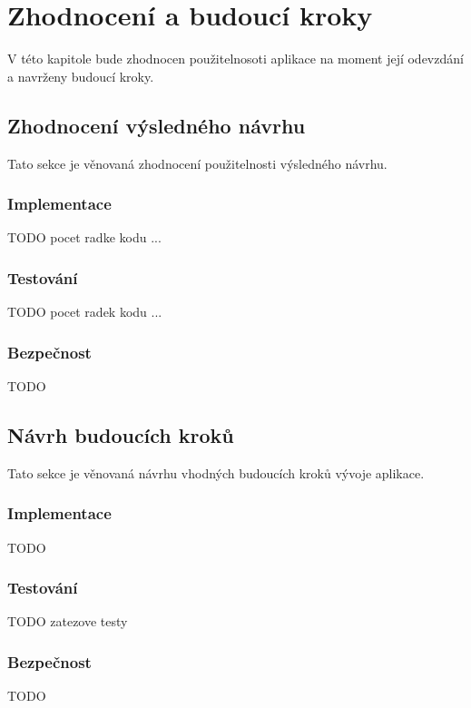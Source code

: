 \chapter{Zhodnocení a budoucí kroky}
V této kapitole bude zhodnocen použitelnosoti aplikace na moment její odevzdání a navrženy budoucí kroky.
\section{Zhodnocení výsledného návrhu}
    Tato sekce je věnovaná zhodnocení použitelnosti výsledného návrhu. 
    \subsection{Implementace}
        TODO pocet radke kodu ...
    \subsection{Testování}
        TODO pocet radek kodu ...
    \subsection{Bezpečnost}
        TODO

\section{Návrh budoucích kroků}
    Tato sekce je věnovaná návrhu vhodných budoucích kroků vývoje aplikace.
    \subsection{Implementace}
        TODO
    \subsection{Testování}
        TODO zatezove testy
    \subsection{Bezpečnost}
        TODO
